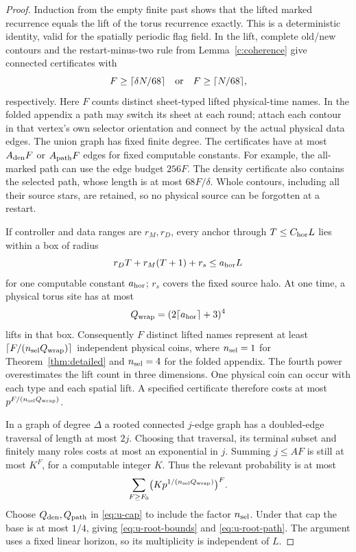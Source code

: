 \begin{proof}
Induction from the empty finite past shows that the lifted marked
recurrence equals the lift of the torus recurrence exactly. This is a
deterministic identity, valid for the spatially periodic flag field.
In the lift, complete old/new contours and the restart-minus-two rule
from Lemma~\ref{c:coherence} give connected certificates with
\[
 F\ge\lceil\delta N/68\rceil\quad\hbox{or}\quad
 F\ge\lceil N/68\rceil,
\]
respectively. Here \(F\) counts distinct sheet-typed lifted physical-time names.
In the folded appendix a path may switch its sheet at each round; attach each contour in
that vertex's own selector orientation and connect by the actual
physical data edges. The union graph has fixed finite degree.
The certificates have at most \(A_{\rm den}F\) or
\(A_{\rm path}F\) edges for fixed computable constants. For example,
the all-marked path can use the edge budget \(256F\).
The density certificate also contains the selected path, whose length
is at most \(68F/\delta\). Whole contours, including all their source
stars, are retained, so no physical source can be forgotten at a
restart.

If controller and data ranges are \(r_M,r_D\), every anchor through
\(T\le C_{\rm hor}L\) lies within a box of radius
\[
 r_DT+r_M(T+1)+r_s\le a_{\rm hor}L
\]
for one computable constant \(a_{\rm hor}\); \(r_s\) covers the fixed
source halo. At one time, a physical torus site has at most
\begin{equation}\label{eq:u-multiplicity}
 Q_{\rm wrap}=(2\lceil a_{\rm hor}\rceil+3)^4
\end{equation}
lifts in that box. Consequently \(F\) distinct lifted names represent
at least \(\lceil F/(n_{\rm sel} Q_{\rm wrap})\rceil\) independent physical coins,
where \(n_{\rm sel}=1\) for Theorem~\ref{thm:detailed} and
\(n_{\rm sel}=4\) for the folded appendix. The fourth power overestimates the lift count in three dimensions. One physical coin can
occur with each type and each spatial lift. A specified certificate
therefore costs at most \(p^{F/(n_{\rm sel} Q_{\rm wrap})}\).

In a graph of degree \(\Delta\) a rooted connected
\(j\)-edge graph has a doubled-edge traversal of length at most \(2j\).
Choosing that traversal, its terminal subset and finitely many roles
costs at most an exponential in \(j\). Summing \(j\le AF\) is still
at most \(K^F\), for a computable integer \(K\). Thus the relevant
probability is at most
\[
 \sum_{F\ge F_0}\bigl(Kp^{1/(n_{\rm sel} Q_{\rm wrap})}\bigr)^F.
\]
Choose \(Q_{\rm den},Q_{\rm path}\) in \eqref{eq:u-cap} to include
the factor \(n_{\rm sel}\). Under that cap the base is at most \(1/4\), giving
\eqref{eq:u-root-bounds} and \eqref{eq:u-root-path}. The argument uses a fixed linear horizon, so its
multiplicity is independent of \(L\).
\end{proof}


